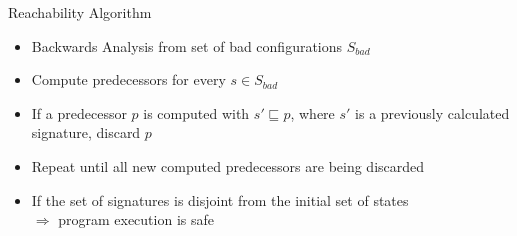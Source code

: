 \begin{frame}[fragile]{Reachability Algorithm}
    
    \pause

    \begin{itemize}
        \item <2-> Backwards Analysis from set of bad configurations $S_{bad}$
        \item <3-> Compute predecessors for every $s \in S_{bad}$
        \item <4-> If a predecessor $p$ is computed with $s' \sqsubseteq p$, where $s'$ is a previously calculated signature, discard $p$
        \item <5-> Repeat until all new computed predecessors are being discarded
        \item <6-> If the set of signatures is disjoint from the initial set of states\\
         $\Rightarrow$ program execution is safe
    \end{itemize}

\end{frame}